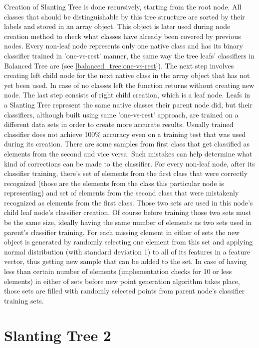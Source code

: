 \label{slanting_tree_implementation}Creation of Slanting Tree is done recursively, starting from the root node. All classes that should be distinguishable by this tree structure are sorted by their labels and stored in an array object. This object is later used during node creation method to check what classes have already been covered by previous nodes. Every non-leaf node represents only one native class and has its binary classifier trained in 'one-vs-rest' manner, the same way the tree leafs' classifiers in Balanced Tree are (see \ref{balanced_tree:one-vs-rest}). The next step involves creating left child node for the next native class in the array object that has not yet been used. In case of no classes left the function returns without creating new node. The last step consists of right child creation, which is a leaf node. Leafs in a Slanting Tree represent the same native classes their parent node did, but their classifiers, although built using same 'one-vs-rest' approach, are trained on a different data sets in order to create more accurate results. Usually trained classifier does not achieve 100\% accuracy even on a training test that was used during its creation. There are some samples from first class that get classified as elements from the second and vice versa. Such mistakes can help determine what kind of corrections can be made to the classifier. For every non-leaf node, after its classifier training, there's set of elements from the first class that were correctly recognized (those are the elements from the class this particular node is representing) and set of elements from the second class that were mistakenly recognized as elements from the first class. Those two sets are used in this node's child leaf node's classifier creation. Of course before training those two sets must be the same size, ideally having the same number of elements as two sets used in parent's classifier training. For each missing element in either of sets the new object is generated by randomly selecting one element from this set and applying normal distribution (with standard deviation 1) to all of its features in a feature vector, thus getting new sample that can be added to the set. In case of having less than certain number of elements (implementation checks for 10 or less elements) in either of sets before new point generation algorithm takes place, those sets are filled with randomly selected points from parent node's classifier training sets.

\section{Slanting Tree 2}

